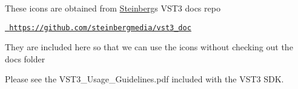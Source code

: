 These icons are obtained from \mbox{\hyperlink{namespace_steinberg}{Steinberg}}\textquotesingle{}s V\+S\+T3 docs repo

\href{https://github.com/steinbergmedia/vst3_doc}{\texttt{ https\+://github.\+com/steinbergmedia/vst3\+\_\+doc}}

They are included here so that we can use the icons without checking out the docs folder

Please see the V\+S\+T3\+\_\+\+Usage\+\_\+\+Guidelines.\+pdf included with the V\+S\+T3 S\+DK. 